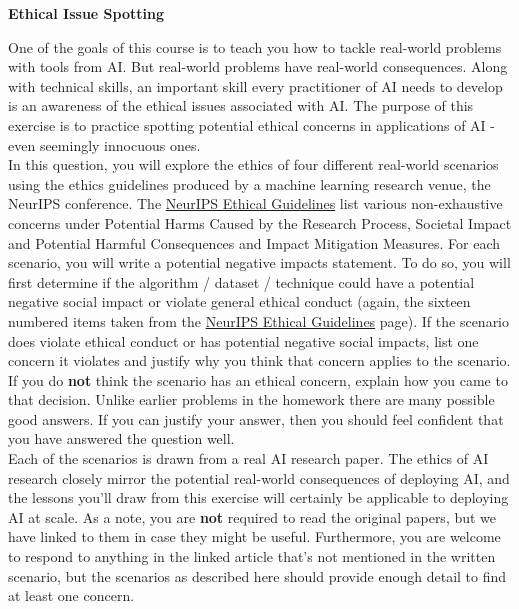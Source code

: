 \item {\bf Ethical Issue Spotting}

One of the goals of this course is to teach you how to tackle real-world problems with tools from AI.  But real-world problems have real-world consequences. Along with technical skills, an important skill every practitioner of AI needs to develop is an awareness of the ethical issues associated with AI. The purpose of this exercise is to practice spotting potential ethical concerns in applications of AI - even seemingly innocuous ones.\\

In this question, you will explore the ethics of four different real-world scenarios using the ethics guidelines produced by a machine learning research venue, the NeurIPS conference. The \href{https://neurips.cc/public/EthicsGuidelines}{NeurIPS Ethical Guidelines} list various non-exhaustive concerns under Potential Harms Caused by the Research Process, Societal Impact and Potential Harmful Consequences and Impact Mitigation Measures. For each scenario, you will write a potential negative impacts statement. To do so, you will first determine if the algorithm / dataset / technique could have a potential negative
social impact or violate general ethical conduct (again, the sixteen numbered items taken from the \href{https://neurips.cc/public/EthicsGuidelines}{NeurIPS Ethical Guidelines} page). If the scenario does violate ethical conduct or has potential negative social impacts, list one concern it violates and justify why you think that concern applies to the scenario. If you do \textbf{not} think the scenario has an ethical concern, explain how you came to that decision. 
Unlike earlier problems in the homework there are many possible good answers. If you can justify your answer, then you should feel confident that you have answered the question well.\\

Each of the scenarios is drawn from a real AI research paper. The ethics of AI research closely mirror the potential real-world consequences of deploying AI, and the lessons you’ll draw from this exercise will certainly be applicable to deploying AI at scale. As a note, you are \textbf{not} required to read the original papers, but we have linked to them in case they might be useful. Furthermore, you are welcome to respond to anything in the linked article that's not mentioned in the written scenario, but the scenarios as described here should provide enough detail to find at least one concern.\\

